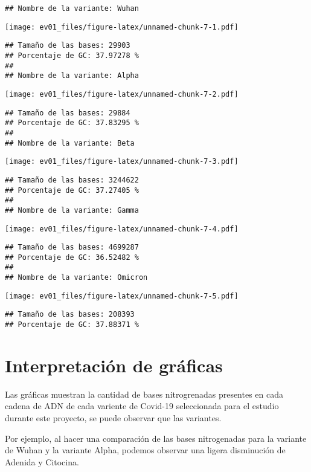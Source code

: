 \documentclass[
]{article}
\begin{document}
\begin{verbatim}
## Nombre de la variante: Wuhan
\end{verbatim}

\texttt{[image: ev01\_files/figure-latex/unnamed-chunk-7-1.pdf]}

\begin{verbatim}
## Tamaño de las bases: 29903 
## Porcentaje de GC: 37.97278 %
## 
## Nombre de la variante: Alpha
\end{verbatim}

\texttt{[image: ev01\_files/figure-latex/unnamed-chunk-7-2.pdf]}

\begin{verbatim}
## Tamaño de las bases: 29884 
## Porcentaje de GC: 37.83295 %
## 
## Nombre de la variante: Beta
\end{verbatim}

\texttt{[image: ev01\_files/figure-latex/unnamed-chunk-7-3.pdf]}

\begin{verbatim}
## Tamaño de las bases: 3244622 
## Porcentaje de GC: 37.27405 %
## 
## Nombre de la variante: Gamma
\end{verbatim}

\texttt{[image: ev01\_files/figure-latex/unnamed-chunk-7-4.pdf]}

\begin{verbatim}
## Tamaño de las bases: 4699287 
## Porcentaje de GC: 36.52482 %
## 
## Nombre de la variante: Omicron
\end{verbatim}

\texttt{[image: ev01\_files/figure-latex/unnamed-chunk-7-5.pdf]}

\begin{verbatim}
## Tamaño de las bases: 208393 
## Porcentaje de GC: 37.88371 %
\end{verbatim}

\hypertarget{interpretaciuxf3n-de-gruxe1ficas}{%
\section{Interpretación de
gráficas}\label{interpretaciuxf3n-de-gruxe1ficas}}

Las gráficas muestran la cantidad de bases nitrogrenadas presentes en
cada cadena de ADN de cada variente de Covid-19 seleccionada para el
estudio durante este proyecto, se puede observar que las variantes.

Por ejemplo, al hacer una comparación de las bases nitrogenadas para la
variante de Wuhan y la variante Alpha, podemos observar una ligera
disminución de Adenida y Citocina.
\end{document}
